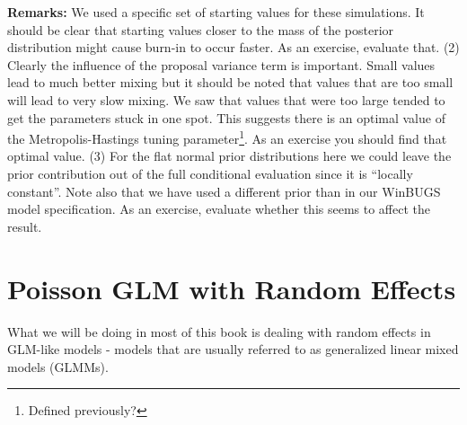 {\bf Remarks:} We used a specific set of starting values for these
simulations. It should be clear that starting values closer to the
mass of the posterior distribution might cause burn-in to occur
faster. As an exercise, evaluate that.  (2) Clearly the influence of
the proposal variance term is important. Small values lead to much
better mixing but it should be noted that values that are too small
will lead to very slow mixing. We saw that values that were too large
tended to get the parameters stuck in one spot. This suggests there is
an optimal value of the Metropolis-Hastings tuning
parameter\footnote{Defined previously?}. As an exercise you should
find that optimal value. (3) For the flat normal prior distributions
here we could leave the prior contribution out of the full conditional
evaluation since it is ``locally constant''. Note also that we have
used a different prior than in our WinBUGS model specification. As an
exercise, evaluate whether this seems to affect the result.

\section{Poisson GLM with Random Effects}

What we will be doing in most of this book is dealing with random effects in GLM-like models - models that are usually referred to as generalized linear mixed models (GLMMs).

